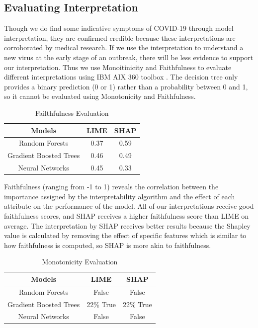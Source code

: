 \newpage
\subsection{\textbf{Evaluating Interpretation}}

Though we do find some indicative symptoms of COVID-19 through model interpretation, they are confirmed credible because these interpretations are corroborated by medical research. If we use the interpretation to understand a new virus at the early stage of an outbreak, there will be less evidence to support our interpretation. Thus we use Monoitinicity and Faithfulness to evaluate different interpretations using IBM AIX 360 toolbox \cite{aix360-sept-2019}. The decision tree only provides a binary prediction (0 or 1) rather than a probability between 0 and 1, so it cannot be evaluated using Monotonicity and Faithfulness.

\begin{table}[H]
\centering
\caption{Failthfulness Evaluation}
\begin{tabular}{@{}ccc@{}}
\toprule
Models   & LIME & SHAP \\ \midrule
Random Forests & 0.37  & 0.59      \\
Gradient Boosted Trees & 0.46 & 0.49 \\
Neural Networks & 0.45 & 0.33 \\ \bottomrule
\end{tabular}
\end{table}

Faithfulness (ranging from -1 to 1) reveals the correlation between the importance assigned by the interpretability algorithm and the effect of each attribute on the performance of the model. All of our interpretations receive good faithfulness scores, and SHAP receives a higher faithfulness score than LIME on average. The interpretation by SHAP receives better results because the Shapley value is calculated by removing the effect of specific features which is similar to how faithfulness is computed, so SHAP is more akin to faithfulness.

\begin{table}[H]
\centering
\caption{Monotonicity Evaluation}
\begin{tabular}{@{}ccc@{}}
\toprule
Models   & LIME & SHAP \\ \midrule
Random Forests & False  & False      \\
Gradient Boosted Trees & 22\% True & 22\% True \\
Neural Networks & False & False \\ \bottomrule
\end{tabular}
\end{table}

